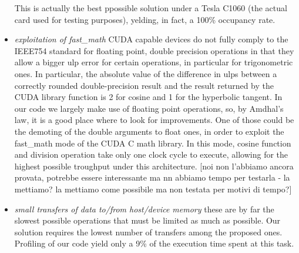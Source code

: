 \begin{itemize}
This is actually the best ppossible solution under a Tesla C1060 (the actual card used for testing purposes), yelding, in fact, a 100\% occupancy rate.
\item \textsl{exploitation of fast\_math} CUDA capable devices do not fully comply to the IEEE754 standard for floating point, double precision operations in that they allow a bigger ulp error for certain operations, in particular for trigonometric ones. In particular, the absolute value of the difference in ulps between a correctly rounded double-precision result and the result returned by the CUDA library function is 2 for cosine and 1 for the hyperbolic tangent. In our code we largely make use of floating point operations, so, by Amdhal's law, it is a good place where to look for improvements. One of those could be the demoting of the double arguments to float ones, in order to exploit the fast\_math mode of the CUDA C math library. In this mode, cosine function and division operation take only one clock cycle to execute, allowing for the highest possible troughput under this architecture. [noi non l'abbiamo ancora provata, potrebbe essere interessante ma nn abbiamo tempo per testarla - la mettiamo? la mettiamo come possibile ma non testata per motivi di tempo?]
\item \textsl{small transfers of data to/from host/device memory} these are by far the slowest possible operations that must be limited as much as possible. Our solution requires the lowest number of transfers among the proposed ones. Profiling of our code yield only a 9\% of the execution time spent at this task.
\end{itemize}

